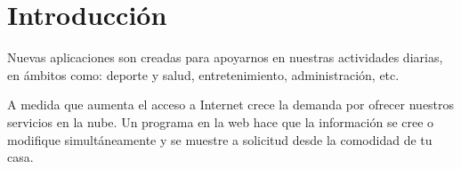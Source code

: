 \section{Introducción}
Nuevas aplicaciones son creadas para apoyarnos en nuestras actividades diarias, en ámbitos como: deporte y salud, entretenimiento, administración, etc.

A medida que aumenta el acceso a Internet\cite{itu} crece la demanda por ofrecer nuestros servicios en la nube. Un programa en la web hace que la información se cree o modifique simultáneamente y se muestre a solicitud desde la comodidad de tu casa.